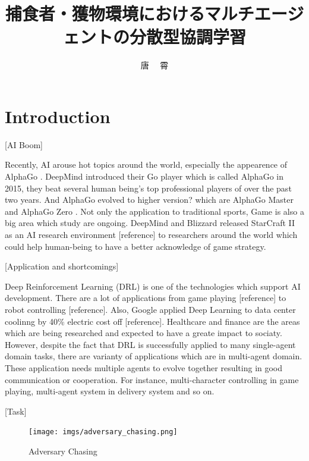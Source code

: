 \documentclass[11pt,twocolumn]{jarticle} %
\title{捕食者・獲物環境におけるマルチエージェントの分散型協調学習}
\author{唐 \ \ 霄}
\begin{document}
\maketitle
\thispagestyle{iitheader}
\section{Introduction}
[AI Boom] \par
Recently, AI arouse hot topics around the world, especially the appearence of AlphaGo \cite{1}. DeepMind introduced their Go player which is called AlphaGo in 2015, they beat several human being's top professional players of over the past two years. And AlphaGo evolved to higher version? which are AlphaGo Master and AlphaGo Zero \cite{2}. Not only the application to traditional sports, Game is also a big area which study are ongoing. DeepMind and Blizzard released StarCraft II as an AI research environment [reference] to researchers around the world which could help human-being to have a better acknowledge of game strategy.\par

[Application and shortcomings] \par
Deep Reinforcement Learning (DRL) is one of the technologies which support AI development. There are a lot of applications from game playing [reference] to robot controlling [reference]. Also, Google applied Deep Learning to data center coolinng by 40\% \cite{3} electric cost off [reference]. Healthcare and finance are the areas which are being researched and expected to have a greate impact to sociaty. However, despite the fact that DRL is successfully applied to many single-agent domain tasks, there are varianty of applications which are in multi-agent domain. These application needs multiple agents to evolve together resulting in good communication or cooperation. For instance, multi-character controlling in game playing, multi-agent system in delivery system and so on.

[Task]
\begin{figure}[t]
 \begin{center}
  \texttt{[image: imgs/adversary\_chasing.png]}
  \caption{Adversary Chasing}\label{fig:adversaryChasing}
 \end{center}
\end{figure}
\end{document}
